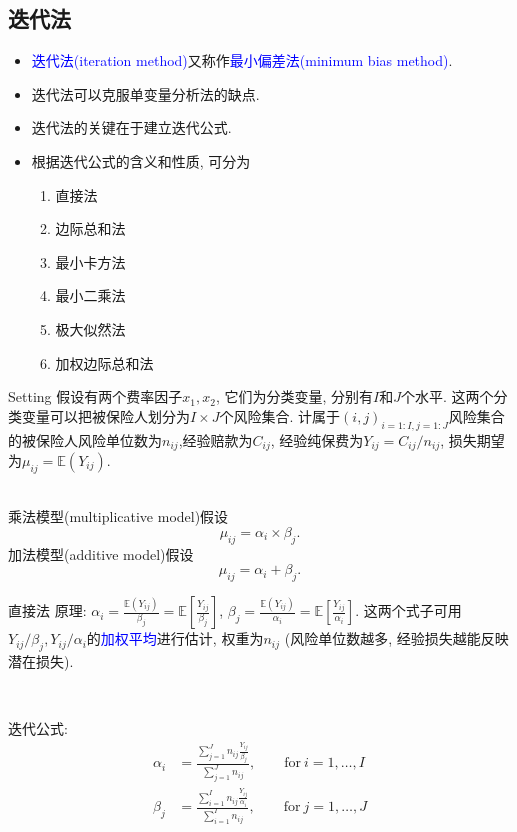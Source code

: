 \documentclass[professionalfont]{beamer}
\def\E{{\mathbb E}}
\newcommand{\blue}[1]{\textcolor{blue}{#1}}
\begin{document}
\subsection{迭代法}
\begin{frame}
	\begin{itemize}
	\item \blue{迭代法(iteration method)}又称作\blue{最小偏差法(minimum bias method)}.
	\item 迭代法可以克服单变量分析法的缺点.
	\item 迭代法的关键在于建立迭代公式.
	\item 根据迭代公式的含义和性质, 可分为
	\begin{enumerate}
		\item 直接法
		\item 边际总和法
		\item 最小卡方法
		\item 最小二乘法
		\item 极大似然法
		\item 加权边际总和法
	\end{enumerate}
	\end{itemize}
\end{frame}
\begin{frame}{Setting}
	假设有两个费率因子$x_1, x_2$, 它们为分类变量, 分别有$I$和$J$个水平. 这两个分类变量可以把被保险人划分为$I\times J$个风险集合. 计属于$(i,j)_{i=1:I, j=1:J}$风险集合的被保险人风险单位数为$n_{ij}$,经验赔款为$C_{ij}$, 经验纯保费为$Y_{ij}=C_{ij}/n_{ij}$, 损失期望为$\mu_{ij}=\E(Y_{ij})$.\\
	
	~
	
	乘法模型(multiplicative model)假设
	$$\mu_{ij}=\alpha_i\times\beta_j.$$
	加法模型(additive model)假设
	$$\mu_{ij}=\alpha_i+\beta_j.$$
\end{frame}
\begin{frame}{直接法}
	原理: $\alpha_i=\frac{\E(Y_{ij})}{\beta_j}=\E\left[\frac{Y_{ij}}{\beta_j}\right]$, $\beta_j=\frac{\E(Y_{ij})}{\alpha_i}=\E\left[\frac{Y_{ij}}{\alpha_i}\right]$. 这两个式子可用$Y_{ij}/\beta_j, Y_{ij}/\alpha_i$的\blue{加权平均}进行估计, 权重为$n_{ij}$ (风险单位数越多, 经验损失越能反映潜在损失). 
	
	~
	
	迭代公式:
	\begin{equation}\label{straight}
	\begin{aligned}
	\alpha_i&=\frac{\sum_{j=1}^Jn_{ij}\frac{Y_{ij}}{\beta_j}}{\sum_{j=1}^Jn_{ij}},\qquad\text{for} ~ i=1,\ldots,I\\
	\beta_j&=\frac{\sum_{i=1}^In_{ij}\frac{Y_{ij}}{\alpha_i}}{\sum_{i=1}^In_{ij}},\qquad \text{for} ~ j=1,\ldots,J
	\end{aligned}
	\end{equation}
	
\end{frame}
\end{document}
